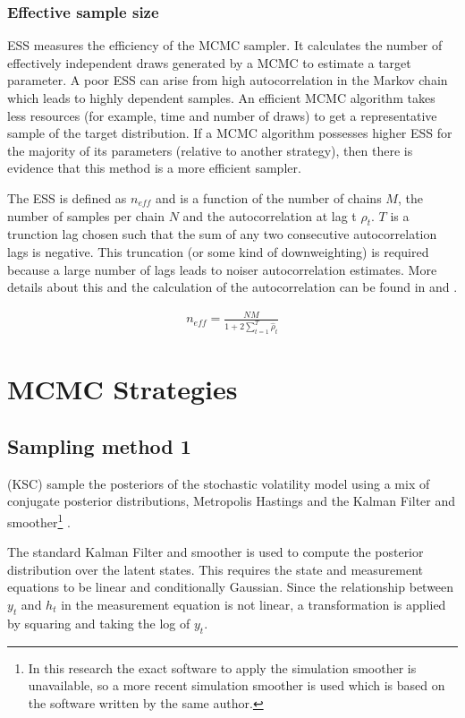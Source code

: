 \documentclass[12pt, a4paper]{article}
\begin{document}
            \subsubsection{Effective sample size}
            ESS measures the efficiency of the MCMC sampler. It calculates the number of effectively independent draws generated by a MCMC to estimate a target parameter. A poor ESS can arise from high autocorrelation in the Markov chain which leads to highly dependent samples. An efficient MCMC algorithm takes less resources (for example, time and number of draws) to get a representative sample of the target distribution. If a MCMC algorithm possesses higher ESS for the majority of its parameters (relative to another strategy), then there is evidence that this method is a more efficient sampler.
            
            The ESS is defined as $n_{eff}$ and is a function of the number of chains $M$, the number of samples per chain $N$ and the autocorrelation at lag t $\rho_t$. $T$ is a trunction lag chosen such that the sum of any two consecutive autocorrelation lags is negative. This truncation (or some kind of downweighting) is required because a large number of lags leads to noiser autocorrelation estimates. More details about this and the calculation of the autocorrelation can be found in \citep{vehtari2021rank} and \citet{geyer1992practical}.

            $$
            \begin{aligned}
                n_{eff} = \frac{NM}{1+2 \sum_{t=1}^T \hat{\rho}_t}
            \end{aligned}
            $$

\section{MCMC Strategies}

    \subsection{Sampling method 1}
        (KSC) sample the posteriors of the stochastic volatility model using a mix of conjugate posterior distributions, Metropolis Hastings and the Kalman Filter and smoother\footnote{In this research the exact software to apply the simulation smoother is unavailable, so a more recent simulation smoother is used which is based on the software written by the same author.} \citep{dejong1995}.

        The standard Kalman Filter and smoother is used to compute the posterior distribution over the latent states. This requires the state and measurement equations to be linear and conditionally Gaussian. Since the relationship between $y_t$ and $h_t$ in the measurement equation is not linear, a transformation is applied by squaring and taking the log of $y_t$.
\end{document}
